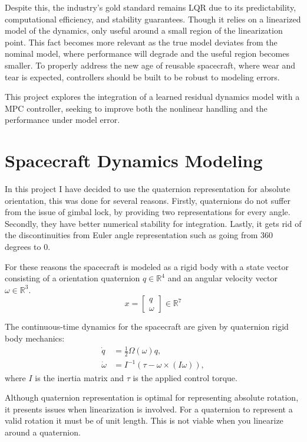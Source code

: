 \documentclass[conference]{IEEEtran}
\begin{document}
Despite this, the industry's gold standard remains LQR due to its predictability,
computational efficiency, and stability guarantees. Though it relies on a linearized
model of the dynamics, only useful around a small region of the linearization point.
This fact becomes more relevant as the true model deviates from the nominal model, where 
performance will degrade and the useful region becomes smaller.
To properly address the new age of reusable spacecraft, where wear and tear is expected,
controllers should be built to be robust to modeling errors.

This project explores the integration of a learned residual dynamics model 
with a MPC controller, seeking to improve both the nonlinear handling and 
the performance under model error.

\section{Spacecraft Dynamics Modeling}
In this project I have decided to use the quaternion representation for absolute orientation, 
this was done for several reasons. Firstly, quaternions do not suffer from the issue of 
gimbal lock, by providing two representations for every angle. Secondly,
they have better numerical stability for integration. Lastly, it gets rid of the
discontinuities from Euler angle representation such as going from 360 degrees to 0.

For these reasons the spacecraft is modeled as a rigid body with a state vector consisting of
a orientation quaternion \( q \in \mathbb{R}^4 \) and an angular velocity vector
\( \omega \in \mathbb{R}^3 \).
\begin{equation}
x = \begin{bmatrix} q \\ \omega \end{bmatrix} \in \mathbb{R}^7
\end{equation}

The continuous-time dynamics for the spacecraft are given by quaternion rigid body mechanics:
\begin{align}
\dot{q} &= \frac{1}{2}\Omega(\omega) q, \\
\dot{\omega} &= I^{-1}(\tau - \omega \times (I\omega)),
\end{align}
where \( I \) is the inertia matrix and \( \tau \) is the applied control
torque.

Although quaternion representation is optimal for representing absolute rotation,
it presents issues when linearization is involved. For a quaternion to represent a
valid rotation it must be of unit length. This is not viable when you linearize around a quaternion.
\end{document}
